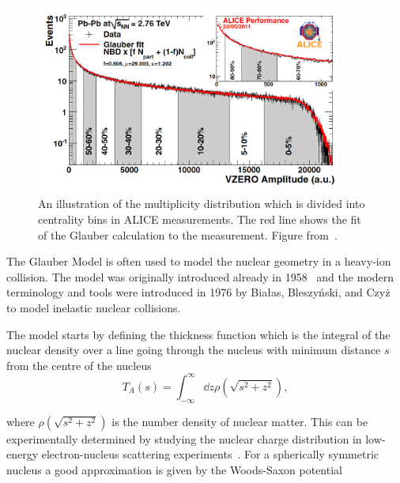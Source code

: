 \begin{figure}[tb]
\centering

               \includegraphics[width=0.9\textwidth]{figures/centrality.png}
        \caption[An illustration of the multiplicity distribution in ALICE measurement with centrality classes.]{An illustration of the multiplicity distribution which is divided into centrality bins in ALICE measurements. The red line shows the fit of the Glauber calculation to the measurement. Figure from~\cite{PhysRevC.88.044909}.}
        	\label{fig:centrality}
\end{figure}


The Glauber Model is often used to model the nuclear geometry in a heavy-ion collision. The model was originally introduced already in 1958~\cite{Glauber:1959} and the modern terminology and tools were introduced in 1976 by Białas, Bleszyński, and Czyż~\cite{Biallas1976461} to model inelastic nuclear collisions.


The model starts by defining the thickness function which is the integral of the nuclear density over a line going through the nucleus with minimum distance $s$ from the centre
of the nucleus
\begin{equation}
T_A\left(s\right)=\int_{-\infty}^{\infty}\dd z \rho\left(\sqrt{s^2+z^2}\right),
\end{equation}

\noindent where $ \rho\left(\sqrt{s^2+z^2}\right)$ is the number density of nuclear matter. This can be experimentally determined by studying the nuclear charge distribution in low-energy electron-nucleus scattering experiments~\cite{Miller:2007ri,DeJager:1987qc}. For a spherically symmetric nucleus a good approximation is given by the Woods-Saxon potential~\cite{Abelev:2013qoq}

